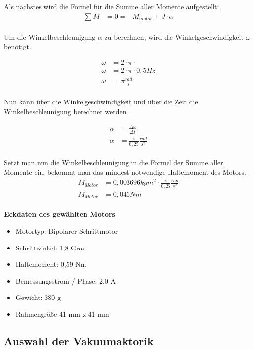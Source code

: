 Als nächstes wird die Formel für die Summe aller Momente aufgestellt:
\begin{align*}
    \sum M &= 0 = -M_{motor}+ J\cdot \alpha\\
\end{align*}

Um die Winkelbeschleunigung $\alpha$ zu berechnen, wird die Winkelgeschwindigkeit $\omega$ benötigt.

\begin{align*}
    \omega &= 2 \cdot \pi \cdot\\
    \omega &= 2 \cdot \pi \cdot 0,5 Hz\\
    \omega &= \pi \tfrac{rad}{s}\\
\end{align*}

Nun kann über die Winkelgeschwindigkeit und über die Zeit die Winkelbeschleunigung berechnet werden.

\begin{align*}
    \alpha &= \frac{\Delta \omega }{\Delta t}\\
    \alpha &= \frac{\pi }{0,25} \tfrac{rad}{s^{2}}\\
\end{align*}

Setzt man nun die Winkelbeschleunigung in die Formel der Summe aller Momente ein, bekommt man das mindest notwendige
Haltemoment des Motors.
\begin{align*}
    M_{Motor} &= 0,003696kgm^{2} \cdot \frac{\pi }{0,25}\tfrac{rad}{s^{2}}\\
    M_{Motor} &= 0,046Nm\\
\end{align*}




\textbf{Eckdaten des gewählten Motors}
\begin{itemize}
    \item Motortyp: Bipolarer Schrittmotor
    \item Schrittwinkel: 1,8 Grad
    \item Haltemoment: 0,59 Nm
    \item Bemessungsstrom / Phase: 2,0 A
    \item Gewicht: 380 g
    \item Rahmengröße 41 mm x 41 mm
\end{itemize}
\subsection{Auswahl der Vakuumaktorik}
